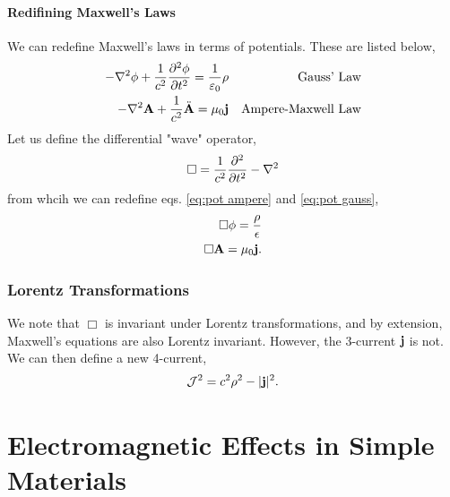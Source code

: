 \documentclass{book}
\begin{document}
\subsubsection{Redifining Maxwell's Laws}
We can redefine Maxwell's laws in terms of potentials. These are listed below,
\begin{align}
	-\laplacian\phi + \frac{1}{c^2}\pdv[2]{\phi}{t} = \frac{1}{\varepsilon_0}\rho && \text{Gauss' Law} \label{eq:pot gauss} \\
	-\laplacian\vb{A} + \frac{1}{c^2}\Ddot{\vb{A}} = \mu_0 \vb{j} && \text{Ampere-Maxwell Law} \label{eq:pot ampere}
\end{align}
Let us define the differential "wave" operator,
\begin{equation}
	\Box = \frac{1}{c^2}\pdv[2]{t} - \laplacian
\end{equation}
from whcih we can redefine eqs. \eqref{eq:pot ampere} and \eqref{eq:pot gauss},
\begin{align}
	\Box \phi = \frac{\rho}{\epsilon} \\
	\Box \vb{A} = \mu_0\vb{j}.
\end{align}
\subsection{Lorentz Transformations}
We note that $\Box$ is invariant under Lorentz transformations, and by extension, Maxwell's equations are also Lorentz invariant. However, the 3-current $\vb{j}$ is not. We can then define a new 4-current,
\begin{equation}
	\mathcal{J}^2 = c^2\rho^2 - |\vb{j}|^2.
\end{equation}
\chapter{Electromagnetic Effects in Simple Materials}
\end{document}

